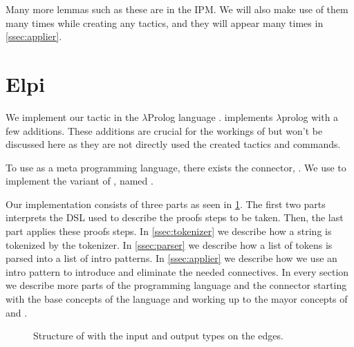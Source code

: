 \documentclass[thesis.tex]{subfiles}
\begin{document}
{Many more lemmas such as these are in the IPM. We will also make use of them many times while creating any tactics, and they will appear many times in \cref{ssec:applier}.

\section{Elpi}\label{sec:elpi}
We implement our tactic in the $\lambda$Prolog language \elpi \cite{dunchevELPIFastEmbeddable2015,guidiImplementingTypeTheory2019}. \elpi implements $\lambda$prolog \cite{millerHigherorderLogicProgramming1986,millerUniformProofsFoundation1991,belleanneePragmaticReconstructionLProlog1999,millerProgrammingHigherOrderLogic2012} with a few additions. These additions are crucial for the workings of \ce but won't be discussed here as they are not directly used the created tactics and commands.

To use \elpi as a \coq meta programming language, there exists the \elpi \coq connector, \ce \cite{tassiElpiExtensionLanguage2018}. We use \ce to implement the \elpi variant of , named .

Our \elpi implementation  consists of three parts as seen in \cref{fig:eiintrosstruct}. The first two parts interprets the DSL used to describe the proofs steps to be taken. Then, the last part applies these proofs steps. In \cref{ssec:tokenizer} we describe how a string is tokenized by the tokenizer. In \cref{ssec:parser} we describe how a list of tokens is parsed into a list of intro patterns. In \cref{ssec:applier} we describe how we use an intro pattern to introduce and eliminate the needed connectives. In every section we describe more parts of the \elpi programming language and the \ce connector starting with the base concepts of the language and working up to the mayor concepts of \elpi and \ce.
\begin{figure}
  \centering
  \caption{Structure of  with the input and output types on the edges.}
  \label{fig:eiintrosstruct}
\end{figure}

}
\end{document}
